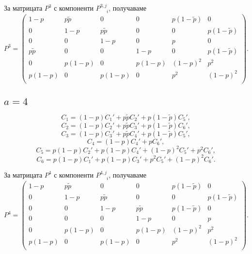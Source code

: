 \documentclass[english,bulgarian,a4paper,10pt]{article}
\begin{document}
За матрицата $P^{3}$ с компоненти $P^{3,j}_{\phantom{3,j}i}$, получаваме
\begin{equation}
 P^{3} = \begin{pmatrix}
          1-p &p\tilde{p} &0 &0 &p(1-\tilde{p}) &0\\
          0 &1-p &p\tilde{p} &0 &0 &p(1-\tilde{p})\\
          0 &0 &1-p &0 &p &0\\
          p\tilde{p} &0 &0 &1-p &0 &p(1-\tilde{p})\\
          0 &p(1-p) &0 &p(1-p) &(1-p)^2 &p^2\\
          p(1-p) &0 &p(1-p) &0 &p^2 &(1-p)^2\\
         \end{pmatrix}.
\end{equation}


\subsection{$a=4$}
$$C_1 = (1-p) C_1' + p\tilde{p} C_2' + p(1-\tilde{p}) C_5',$$
$$C_2 = (1-p) C_2' + p\tilde{p} C_3' + p(1-\tilde{p}) C_6',$$
$$C_3 = (1-p) C_3' + p\tilde{p} C_4' + p(1-\tilde{p}) C_5',$$
$$C_4 = (1-p) C_4' + p C_6',$$
$$C_5 = p(1-p) C_2' + p(1-p) C_4' + (1-p)^2 C_5' + p^2 C_6',$$
$$C_6 = p(1-p) C_1' + p(1-p) C_3' + p^2 C_5' + (1-p)^2 C_6'.$$

За матрицата $P^{4}$ с компоненти $P^{4,j}_{\phantom{4,j}i}$, получаваме
\begin{equation}
 P^{4} = \begin{pmatrix}
          1-p &p\tilde{p} &0 &0 &p(1-\tilde{p}) &0\\
          0 &1-p &p\tilde{p} &0 &0 &p(1-\tilde{p})\\
          0 &0 &1-p &p\tilde{p} &p(1-\tilde{p}) &0\\
          0 &0 &0 &1-p &0 &p\\
          0 &p(1-p) &0 &p(1-p) &(1-p)^2 &p^2\\
          p(1-p) &0 &p(1-p) &0 &p^2 &(1-p)^2\\
         \end{pmatrix}.
\end{equation}
\end{document}
